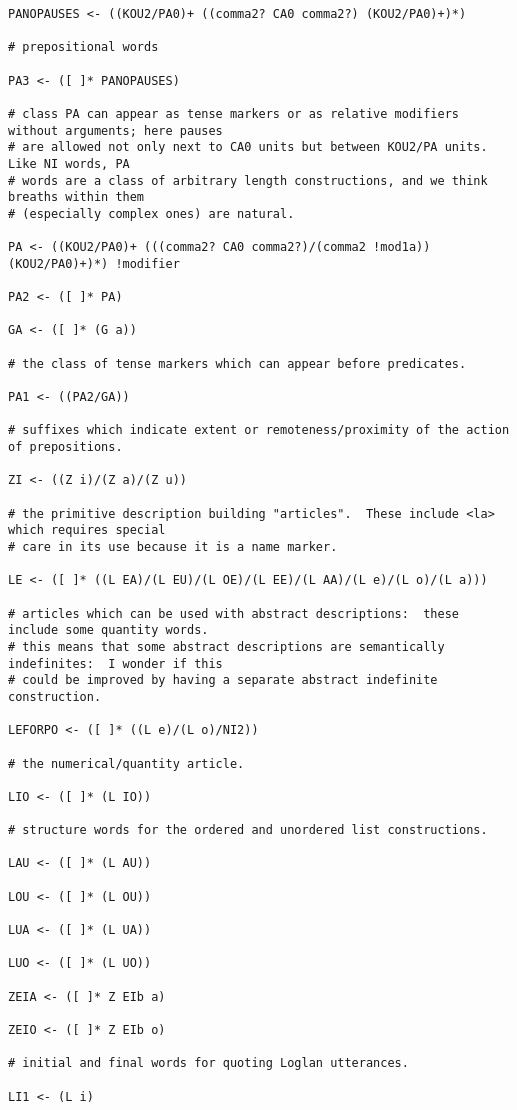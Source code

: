 \documentclass{article}
\begin{document}
\begin{verbatim}
PANOPAUSES <- ((KOU2/PA0)+ ((comma2? CA0 comma2?) (KOU2/PA0)+)*)

# prepositional words

PA3 <- ([ ]* PANOPAUSES)

# class PA can appear as tense markers or as relative modifiers without arguments; here pauses
# are allowed not only next to CA0 units but between KOU2/PA units.  Like NI words, PA
# words are a class of arbitrary length constructions, and we think breaths within them
# (especially complex ones) are natural.

PA <- ((KOU2/PA0)+ (((comma2? CA0 comma2?)/(comma2 !mod1a)) (KOU2/PA0)+)*) !modifier

PA2 <- ([ ]* PA)

GA <- ([ ]* (G a))

# the class of tense markers which can appear before predicates.

PA1 <- ((PA2/GA))

# suffixes which indicate extent or remoteness/proximity of the action of prepositions.

ZI <- ((Z i)/(Z a)/(Z u))

# the primitive description building "articles".  These include <la> which requires special
# care in its use because it is a name marker.

LE <- ([ ]* ((L EA)/(L EU)/(L OE)/(L EE)/(L AA)/(L e)/(L o)/(L a)))

# articles which can be used with abstract descriptions:  these include some quantity words.
# this means that some abstract descriptions are semantically indefinites:  I wonder if this
# could be improved by having a separate abstract indefinite construction.

LEFORPO <- ([ ]* ((L e)/(L o)/NI2))

# the numerical/quantity article.

LIO <- ([ ]* (L IO))

# structure words for the ordered and unordered list constructions.

LAU <- ([ ]* (L AU))

LOU <- ([ ]* (L OU))

LUA <- ([ ]* (L UA))

LUO <- ([ ]* (L UO))

ZEIA <- ([ ]* Z EIb a)

ZEIO <- ([ ]* Z EIb o)

# initial and final words for quoting Loglan utterances.

LI1 <- (L i)


\end{verbatim}
\end{document}
